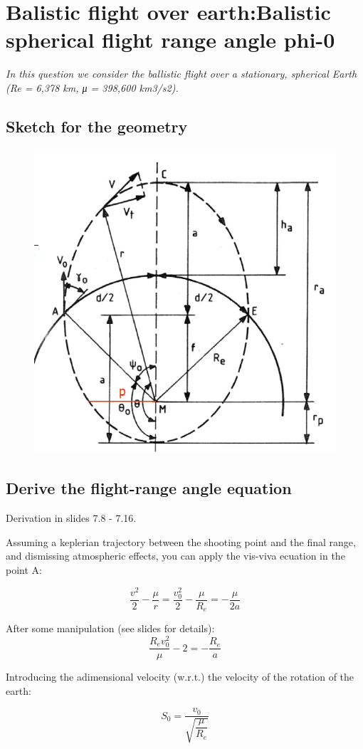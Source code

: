 \section{ Balistic flight over earth:Balistic spherical flight range  angle phi-0 }\label{sec:q3}  
\textit{In this question we consider the ballistic flight over a stationary, spherical Earth (Re = 6,378 km, μ = 398,600 km3/s2).}

  \subsection{Sketch for the geometry}
\begin{figure}[H]
	\centering
	\includegraphics[width=0.4\linewidth]{pics/screenshot001}
	\caption{}
	\label{fig:screenshot001}
\end{figure}

\subsection{Derive the flight-range angle equation}


Derivation in slides 7.8 - 7.16.


Assuming a keplerian trajectory between the shooting point and the final range, and dismissing atmospheric effects, you can apply the vis-viva ecuation in the point A: 

\begin{equation}
\frac{v^2}{2}-\frac{\mu}{r} =\frac{v_0^2}{2}-\frac{\mu}{R_e} =  -\frac{\mu}{2a}
\end{equation}

After some manipulation (see slides for details):
\begin{equation}
\frac{R_ev_0^2}{\mu}-2 = -\frac{R_e}{a}
\end{equation}

Introducing the adimensional velocity (w.r.t.) the velocity of the rotation of the earth:

$$ S_0 = \frac{v_0}{\sqrt{\dfrac{\mu}{R_e}}} $$

